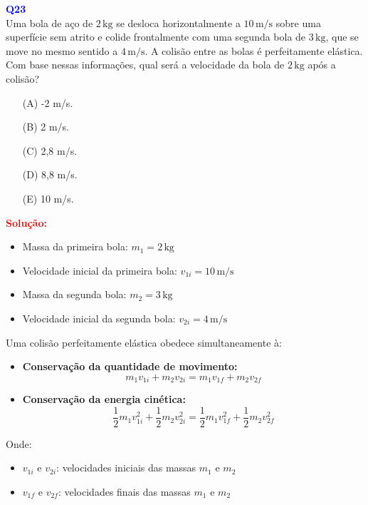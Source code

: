 \documentclass[a4paper,12pt]{article}
\begin{document}
\begin{flushleft}
\textbf{\textcolor{blue}{\Large Q23}}\\

Uma bola de aço de \(2\,\text{kg}\) se desloca horizontalmente a \(10\,\text{m/s}\) sobre uma 
superfície sem atrito e colide frontalmente com uma segunda bola de \(3\,\text{kg}\), que se move 
no mesmo sentido a \(4\,\text{m/s}\). A colisão entre as bolas é perfeitamente elástica. Com base nessas 
informações, qual será a velocidade da bola de \(2\,\text{kg}\) após a colisão?


\begin{itemize}
\item[(A)] -2 m/s.
\item[(B)]  2 m/s.
\item[(C)]  2,8 m/s.
\item[(D)]  8,8 m/s.
\item[(E)]  10 m/s.
\end{itemize}

\vspace{0.5cm}

\textcolor{red}{\textbf{Solução:}}\\

\begin{itemize}
    \item Massa da primeira bola: \(m_1 = 2\,\text{kg}\)
    \item Velocidade inicial da primeira bola: \(v_{1i} = 10\,\text{m/s}\)
    \item Massa da segunda bola: \(m_2 = 3\,\text{kg}\)
    \item Velocidade inicial da segunda bola: \(v_{2i} = 4\,\text{m/s}\)
\end{itemize}

Uma colisão perfeitamente elástica obedece simultaneamente à:

\begin{itemize}
    \item \textbf{Conservação da quantidade de movimento:}
    \[
    m_1v_{1i} + m_2v_{2i} = m_1v_{1f} + m_2v_{2f}
    \]
    \item \textbf{Conservação da energia cinética:}
    \[
    \frac{1}{2}m_1v_{1i}^2 + \frac{1}{2}m_2v_{2i}^2 = \frac{1}{2}m_1v_{1f}^2 + \frac{1}{2}m_2v_{2f}^2
    \]
\end{itemize}

Onde:
\begin{itemize}
    \item \(v_{1i}\) e \(v_{2i}\): velocidades iniciais das massas \(m_1\) e \(m_2\)
    \item \(v_{1f}\) e \(v_{2f}\): velocidades finais das massas \(m_1\) e \(m_2\)
\end{itemize}


\end{flushleft}
\end{document}
